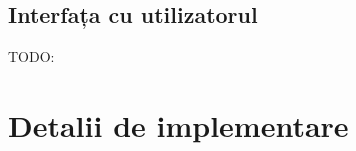 \documentclass[12pt,a4paper]{report}
\begin{document}
\section{Interfața cu utilizatorul}
TODO:
%
%
%
%
%
%
%



\chapter{Detalii de implementare}
\end{document}
